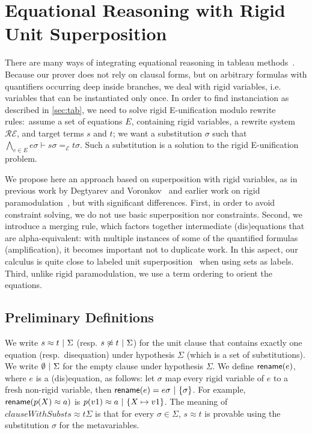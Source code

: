 
\section{Equational Reasoning with Rigid Unit Superposition}
\label{sec:super}

There are many ways of integrating equational reasoning in tableau
methods~\cite{DB75,LS02,BR15,DV96}. Because our prover does not rely on clausal
forms, but on arbitrary formulas with quantifiers occurring deep inside
branches, we deal with rigid variables, i.e. variables that can be instantiated
only once. In order to find instanciation as described in \ref{sec:tab},
we need to solve rigid E-unification modulo rewrite rules:~assume a set of
equations $E$, containing rigid variables, a rewrite system $\mathcal{RE}$,
and target terms $s$ and $t$; we want a substitution $\sigma$ such that
$\bigwedge_{e \in E} e\sigma \vdash s\sigma =_\mathcal{E} t\sigma$. Such a
substitution is a solution to the rigid E-unification problem.

We propose here an approach based on superposition with rigid variables, as in
previous work by Degtyarev and Voronkov~\cite{DV96} and earlier work on rigid
paramodulation~\cite{DAP00}, but with significant differences. First, in order
to avoid constraint solving, we do not use basic superposition nor
constraints. Second, we introduce a merging rule, which factors together
intermediate (dis)equations that are alpha-equivalent: with multiple instances
of some of the quantified formulas (amplification), it becomes important not to
duplicate work. In this aspect, our calculus is quite close to labeled unit
superposition~\cite{KS10} when using sets as labels. Third, unlike rigid
paramodulation, we use a term ordering to orient the equations.

\subsection{Preliminary Definitions}

We write $  s \approx t  ~|~  \Sigma$ (resp.
$ s \not\approx t  ~|~  \Sigma$) for the unit clause that contains
exactly one equation (resp.~disequation) under hypothesis $\Sigma$ (which is a
set of substitutions). We write $\emptyset ~|~ \Sigma$ for the
empty clause under hypothesis $\Sigma$. We define $\textsf{rename}(e)$, where $e$
is a (dis)equation, as follows: let $\sigma$ map every rigid variable of $e$ to
a fresh non-rigid variable, then
$\textsf{rename}(e) =  e\sigma  ~|~  \{ \sigma \} $. For example,
$\textsf{rename}(p(X)\approx a)$ is $ p(v1)\approx a ~|~  \{ X\mapsto
v1\} $.
The meaning of $clauseWithSubst{s \approx t}{ \Sigma}$ is
that for every $\sigma \in \Sigma$, $s \approx t$ is provable using the
substitution $\sigma$ for the metavariables.

